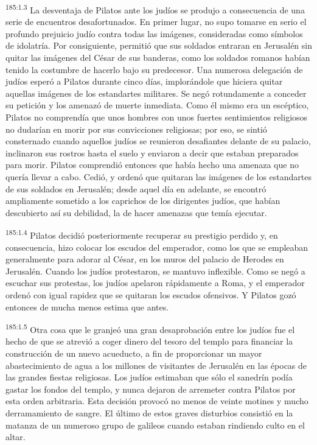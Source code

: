 \par
\textsuperscript{185:1.3} La desventaja de Pilatos ante los judíos se produjo a consecuencia de una serie de encuentros desafortunados. En primer lugar, no supo tomarse en serio el profundo prejuicio judío contra todas las imágenes, consideradas como símbolos de idolatría. Por consiguiente, permitió que sus soldados entraran en Jerusalén sin quitar las imágenes del César de sus banderas, como los soldados romanos habían tenido la costumbre de hacerlo bajo su predecesor. Una numerosa delegación de judíos esperó a Pilatos durante cinco días, implorándole que hiciera quitar aquellas imágenes de los estandartes militares. Se negó rotundamente a conceder su petición y los amenazó de muerte inmediata. Como él mismo era un escéptico, Pilatos no comprendía que unos hombres con unos fuertes sentimientos religiosos no dudarían en morir por sus convicciones religiosas; por eso, se sintió consternado cuando aquellos judíos se reunieron desafiantes delante de su palacio, inclinaron sus rostros hasta el suelo y enviaron a decir que estaban preparados para morir. Pilatos comprendió entonces que había hecho una amenaza que no quería llevar a cabo. Cedió, y ordenó que quitaran las imágenes de los estandartes de sus soldados en Jerusalén; desde aquel día en adelante, se encontró ampliamente sometido a los caprichos de los dirigentes judíos, que habían descubierto así su debilidad, la de hacer amenazas que temía ejecutar.

\par
\textsuperscript{185:1.4} Pilatos decidió posteriormente recuperar su prestigio perdido y, en consecuencia, hizo colocar los escudos del emperador, como los que se empleaban generalmente para adorar al César, en los muros del palacio de Herodes en Jerusalén. Cuando los judíos protestaron, se mantuvo inflexible. Como se negó a escuchar sus protestas, los judíos apelaron rápidamente a Roma, y el emperador ordenó con igual rapidez que se quitaran los escudos ofensivos. Y Pilatos gozó entonces de mucha menos estima que antes.

\par
\textsuperscript{185:1.5} Otra cosa que le granjeó una gran desaprobación entre los judíos fue el hecho de que se atrevió a coger dinero del tesoro del templo para financiar la construcción de un nuevo acueducto, a fin de proporcionar un mayor abastecimiento de agua a los millones de visitantes de Jerusalén en las épocas de las grandes fiestas religiosas. Los judíos estimaban que sólo el sanedrín podía gastar los fondos del templo, y nunca dejaron de arremeter contra Pilatos por esta orden arbitraria. Esta decisión provocó no menos de veinte motines y mucho derramamiento de sangre. El último de estos graves disturbios consistió en la matanza de un numeroso grupo de galileos cuando estaban rindiendo culto en el altar.

